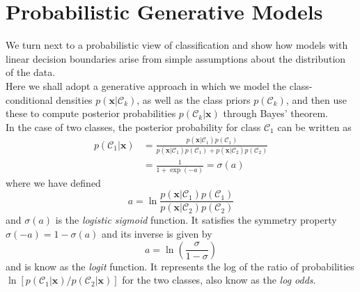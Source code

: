 \documentclass[twoside]{article}
\begin{document}
\section{Probabilistic Generative Models}
We turn next to a probabilistic view of classification and show how models with linear decision boundaries arise from simple assumptions about the distribution of the data.\\
Here we shall adopt a generative approach in which we model the class-conditional densities $p(\boldsymbol{x}|\mathcal{C}_k)$, as well as the class priors $p(\mathcal{C}_k)$, and then use these to compute posterior probabilities $p(\mathcal{C}_k | \boldsymbol{x})$ through Bayes' theorem.\\
In the case of two classes, the posterior probability for class $\mathcal{C}_1$ can be written as
\begin{equation}
\begin{aligned}
    p(\mathcal{C}_1|\boldsymbol{x}) &= \frac{p(\boldsymbol{x}|\mathcal{C}_1)p(\mathcal{C}_1)}{p(\boldsymbol{x}|\mathcal{C}_1)p(\mathcal{C}_1) + p(\boldsymbol{x}|\mathcal{C}_2)p(\mathcal{C}_2)}\\
    &= \frac{1}{1 + \exp{(-a)}} = \sigma(a)
\end{aligned}
\end{equation}
where we have defined
\begin{equation}
    a = \ln{\frac{p(\boldsymbol{x}|\mathcal{C}_1)p(\mathcal{C}_1)}{p(\boldsymbol{x}|\mathcal{C}_2)p(\mathcal{C}_2)}}
\end{equation}
and $\sigma(a)$ is the \textit{logistic sigmoid} function. It satisfies the symmetry property $\sigma(-a) =1 - \sigma(a)$ and its inverse is given by
\begin{equation*}
    a = \ln{(\frac{\sigma}{1 - \sigma})}
\end{equation*}
and is know as the \textit{logit} function. It represents the log of the ratio of probabilities $\ln{[p(\mathcal{C}_1|\boldsymbol{x})/p(\mathcal{C}_2|\boldsymbol{x})]}$ for the two classes, also know as the \textit{log odds}.\medskip
\end{document}
